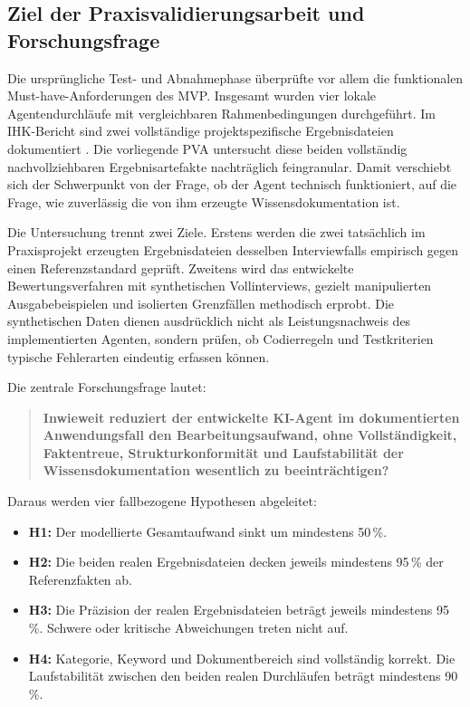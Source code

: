 \documentclass[
  10pt,
  ngerman,
  a4paper,
  toc=graduated,
  numbers=noenddot,
  headings=standardclasses,
  nonumberlist
]{scrartcl}
\newcommand{\pct}[1]{#1\,\%}
\begin{document}
\subsection{Ziel der Praxisvalidierungsarbeit und Forschungsfrage}

Die ursprüngliche Test- und Abnahmephase überprüfte vor allem die funktionalen Must-have-Anforderungen des MVP. Insgesamt wurden vier lokale Agentendurchläufe mit vergleichbaren Rahmenbedingungen durchgeführt. Im IHK-Bericht sind zwei vollständige projektspezifische Ergebnisdateien dokumentiert \cite[S.~13]{sommer2026projekt}. Die vorliegende PVA untersucht diese beiden vollständig nachvollziehbaren Ergebnisartefakte nachträglich feingranular. Damit verschiebt sich der Schwerpunkt von der Frage, ob der Agent technisch funktioniert, auf die Frage, wie zuverlässig die von ihm erzeugte Wissensdokumentation ist.

Die Untersuchung trennt zwei Ziele. Erstens werden die zwei tatsächlich im Praxisprojekt erzeugten Ergebnisdateien desselben Interviewfalls empirisch gegen einen Referenzstandard geprüft. Zweitens wird das entwickelte Bewertungsverfahren mit synthetischen Vollinterviews, gezielt manipulierten Ausgabebeispielen und isolierten Grenzfällen methodisch erprobt. Die synthetischen Daten dienen ausdrücklich nicht als Leistungsnachweis des implementierten Agenten, sondern prüfen, ob Codierregeln und Testkriterien typische Fehlerarten eindeutig erfassen können.

Die zentrale Forschungsfrage lautet:

\begin{quote}
\textbf{Inwieweit reduziert der entwickelte KI-Agent im dokumentierten Anwendungsfall den Bearbeitungsaufwand, ohne Vollständigkeit, Faktentreue, Strukturkonformität und Laufstabilität der Wissensdokumentation wesentlich zu beeinträchtigen?}
\end{quote}

Daraus werden vier fallbezogene Hypothesen abgeleitet:

\begin{itemize}
  \item \textbf{H1:} Der modellierte Gesamtaufwand sinkt um mindestens \pct{50}.
  \item \textbf{H2:} Die beiden realen Ergebnisdateien decken jeweils mindestens \pct{95} der Referenzfakten ab.
  \item \textbf{H3:} Die Präzision der realen Ergebnisdateien beträgt jeweils mindestens \pct{95}. Schwere oder kritische Abweichungen treten nicht auf.
  \item \textbf{H4:} Kategorie, Keyword und Dokumentbereich sind vollständig korrekt. Die Laufstabilität zwischen den beiden realen Durchläufen beträgt mindestens \pct{90}.
\end{itemize}
\end{document}
